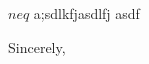 \documentclass{letter}
\date{}
\begin{document}
$neq$  a;sdlkfjasdlfj asdf
\begin{letter}{}
\opening{}
\closing{Sincerely,}
\end{letter}
\end{document}

